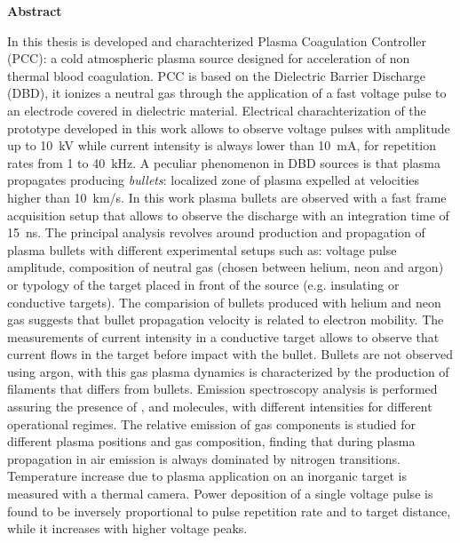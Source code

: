 \documentclass[twoside,openright,titlepage,headings,footinclude=true,cleardoublepage=empty,BCOR=5mm,11pt,a4paper,english]{book}
\begin{document}
\thispagestyle{plain}
\begin{center}
    \vspace{2cm}
    \Large
    \textbf{Abstract}
\end{center}
In this thesis is developed and charachterized Plasma Coagulation Controller (PCC): a cold atmospheric plasma source designed for acceleration of non thermal blood coagulation. PCC is based on the Dielectric Barrier Discharge (DBD), it ionizes a neutral gas through the application of a fast voltage pulse to an electrode covered in dielectric material. Electrical charachterization of the prototype developed in this work allows to observe voltage pulses with amplitude up to \SI{10}{\kilo\volt} while current intensity is always lower than \SI{10}{\milli\ampere}, for repetition rates from \num{1} to \SI{40}{\kilo\hertz}. A peculiar phenomenon in DBD sources is that plasma propagates producing \emph{bullets}: localized zone of plasma expelled at velocities higher than \SI{10}{\kilo\meter/\second}. In this work plasma bullets are observed with a fast frame acquisition setup that allows to observe the discharge with an integration time of \SI{15}{\nano\second}. The principal analysis revolves around production and propagation of plasma bullets with different experimental setups such as: voltage pulse amplitude, composition of neutral gas (chosen between helium, neon and argon) or typology of the target placed in front of the source (e.g. insulating or conductive targets). The comparision of bullets produced with helium and neon gas suggests that bullet propagation velocity is related to electron mobility. The measurements of current intensity in a conductive target allows to observe that current flows in the target before impact with the bullet. Bullets are not observed using argon, with this gas plasma dynamics is characterized by the production of filaments that differs from bullets. 
Emission spectroscopy analysis is performed assuring the presence of ,  and  molecules, with different intensities for different operational regimes. The relative emission of gas components is studied for different plasma positions and gas composition, finding that during plasma propagation in air emission is always dominated by nitrogen transitions.
Temperature increase due to plasma application on an inorganic target is measured with a thermal camera. Power deposition of a single voltage pulse is found to be inversely proportional to pulse repetition rate and to target distance, while it increases with higher voltage peaks.

\clearpage


\tableofcontents

\pagestyle{headings}



\clearpage

\clearpage

\clearpage

\clearpage

\clearpage

\clearpage

\printbibliography
\end{document}
